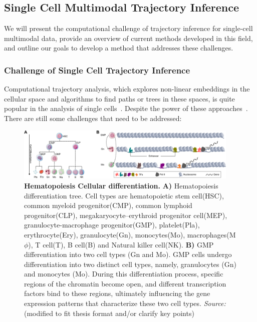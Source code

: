 \subsection{Single Cell Multimodal Trajectory Inference}
We will present the computational challenge of trajectory inference for single-cell multimodal data, provide an overview of current methods developed in this field, and outline our goals to develop a method that addresses these challenges.

\subsubsection{Challenge of Single Cell Trajectory Inference}
\label{background:sec2:challenge_TI}
Computational trajectory analysis, which explores non-linear embeddings in the cellular space and algorithms to find paths or trees in these spaces, is quite popular in the analysis of single cells~\citep{wolf2019paga,chen2019stream,street2018slingshot,Lynch2022}. Despite the power of these approaches~\citep{saelens2019comparison}. There are still some challenges that need to be addressed:

\begin{figure}[!ht]
	\centering
	\includegraphics[width=0.95\textwidth]{cell_differentiation/fig}
	\vspace{0.1cm}
	\caption[Hematopoiesis Cellular Differentiation]{\textbf{Hematopoiesis Cellular differentiation.} \textbf{A)} Hematopoiesis differentiation tree. Cell types are hematopoietic stem cell(HSC), common myeloid progenitor(CMP),  common lymphoid progenitor(CLP), megakaryocyte–erythroid progenitor cell(MEP), granulocyte-macrophage progenitor(GMP), platelet(Pla), erythrocyte(Ery), granulocyte(Gn), monocytes(Mo), macrophages(M$\phi$), T cell(T), B cell(B) and Natural killer cell(NK). \textbf{B)} GMP differentiation into two cell types (Gn and Mo). GMP cells undergo differentiation into two distinct cell types, namely, granulocytes (Gn) and monocytes (Mo). During this differentiation process, specific regions of the chromatin become open, and different transcription factors bind to these regions, ultimately influencing the gene expression patterns that characterize these two cell types. \emph{Source:~\cite{costa2023dissecting}} (modified to fit thesis format and/or clarify key points)}
	\label{fig:cell_differentiation}
\end{figure}

